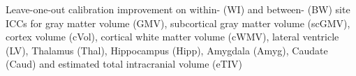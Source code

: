 \label{fig:calib} Leave-one-out calibration improvement on within- (WI) and between- (BW) site ICCs for gray matter volume (GMV), subcortical gray matter volume (scGMV), cortex volume (cVol), cortical white matter volume (cWMV), lateral ventricle (LV), Thalamus (Thal), Hippocampus (Hipp), Amygdala (Amyg), Caudate (Caud) and estimated total intracranial volume (eTIV)